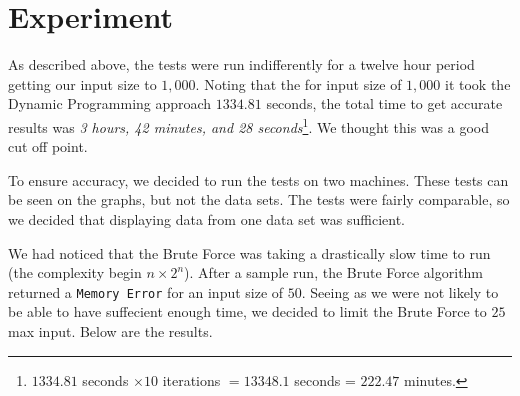 \documentclass{article}
\begin{document}
\section{Experiment}
As described above, the tests were run indifferently for a twelve hour period getting our input size to $1,000$. Noting that the for input size of $1,000$ it took the Dynamic Programming approach $1334.81$ seconds, the total time to get accurate results was \textit{3 hours, 42 minutes, and 28 seconds}\footnote{$1334.81$ seconds $\times 10$ iterations $= 13348.1$ seconds = $222.47$ minutes.}. We thought this was a good cut off point.

To ensure accuracy, we decided to run the tests on two machines. These tests can be seen on the graphs, but not the data sets. The tests were fairly comparable, so we decided that displaying data from one data set was sufficient.

We had noticed that the Brute Force was taking a drastically slow time to run (the complexity begin $n \times 2^n$). After a sample run, the Brute Force algorithm returned a \texttt{Memory Error} for an input size of $50$. Seeing as we were not likely to be able to have suffecient enough time, we decided to limit the Brute Force to $25$ max input. Below are the results.
\end{document}
